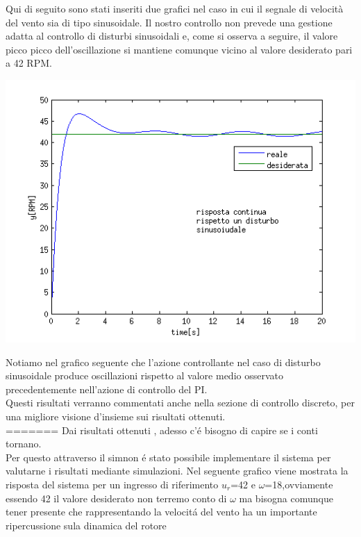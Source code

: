 \documentclass[a4paper,13pt]{article}
\begin{document}
	Qui di seguito sono stati inseriti due grafici nel caso in cui il segnale di velocità del vento sia di tipo 				sinusoidale. Il nostro controllo non prevede una gestione adatta al controllo di disturbi sinusoidali e, come si 			osserva a seguire, il valore picco picco dell'oscillazione si mantiene comunque vicino al valore desiderato pari a 42 		RPM. \\
\begin{center}
\includegraphics[scale=0.6]{graph/ycontsin.png}
\end{center}
	Notiamo nel grafico seguente che l'azione controllante nel caso di disturbo sinusoidale produce oscillazioni rispetto 		al valore medio osservato precedentemente nell'azione di controllo del PI.\\ Questi risultati verranno commentati 			anche nella sezione di controllo discreto, per una migliore visione d'insieme sui risultati ottenuti. \\
=======
Dai risultati ottenuti , adesso c'\'e bisogno di capire se i conti tornano.\\
Per questo attraverso il simnon \'e stato possibile implementare il sistema per valutarne i risultati mediante simulazioni.
Nel seguente grafico viene mostrata la risposta del sistema per un ingresso di riferimento $u_r$=42 e
$\omega$=18,ovviamente essendo 42 il valore desiderato non terremo conto di $\omega$ ma bisogna comunque
tener presente che rappresentando la velocit\'a del vento ha un importante ripercussione sula dinamica del 
rotore
\end{document}
